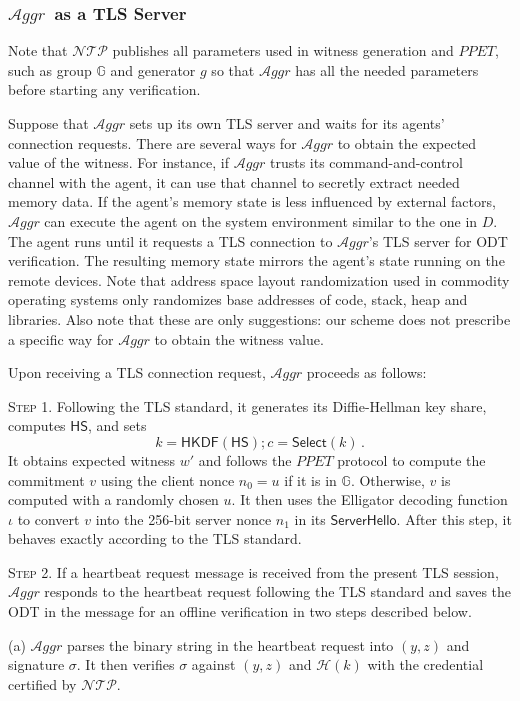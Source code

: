 \documentclass[letterpaper,twocolumn,10pt]{article}
\newcommand{\T}{\ensuremath{\mathcal{A}ggr}\xspace}
\newcommand{\N}{\ensuremath{\mathcal{N\!T}\mathcal{\!P}}\xspace}
\newcommand{\dn}{\ensuremath{D}\xspace}
\newcommand{\GG}{\mathbb{G}}
\begin{document}
\subsubsection{\T\ as a TLS Server}
\label{sec:server}
Note that \N publishes all parameters used in witness generation and $\mathit{PPET}$,
such as group $\GG$ and generator $g$ so that \T has all the needed parameters
before starting any verification.

Suppose that \T sets up its own TLS server and waits for its agents' connection requests.
There are several ways for \T to obtain the expected value of the witness.
For instance, if \T trusts its command-and-control channel with the agent, it can use that
channel to secretly extract needed memory data. If the agent's memory state is less influenced
by external factors, \T can execute the agent on the system environment similar to the one in \dn.
The agent runs until it requests a TLS connection to \T's TLS server for ODT verification. The resulting
memory state mirrors the agent's state running on the remote devices. Note that address space layout
randomization \cite{pax2003pax,aslr-ccs04} used in commodity operating systems only randomizes
base addresses of code, stack, heap and libraries. Also note that these are only suggestions: our scheme
does not prescribe a specific way for \T to obtain the witness value.

Upon receiving a TLS connection request, \T proceeds as follows:
%

\noindent\textsc{Step 1.}
Following the TLS standard, it generates its Diffie-Hellman key share, computes $\mathsf{HS}$, and sets
\[
k=\mathsf{HKDF}(\mathsf{HS});c=\mathsf{Select}(k)\,.
\]
It obtains expected witness $w'$ and follows the $\mathit{PPET}$ protocol to compute the commitment
$v$ using the client nonce $n_0=u$ if it is in $\GG$. Otherwise, $v$ is computed with a randomly chosen $u$.
It then uses the Elligator decoding function $\iota$ to convert $v$ into
the 256-bit server nonce $n_1$ in its $\mathsf{ServerHello}$. After this step, it behaves exactly
according to the TLS standard.

\noindent\textsc{Step 2.}
If a heartbeat request message is received from the present TLS session,
\T responds to the heartbeat request following the TLS standard and saves the
ODT in the message for an offline verification in two steps described below.

(a) \T parses the binary string in the heartbeat request into $(y,z)$ and signature $\sigma$. It then
verifies $\sigma$ against $(y,z)$ and $\mathcal{H}(k)$ with the credential certified by \N.
\end{document}
